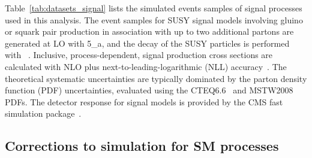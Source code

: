 Table~\ref{tab:datasets_signal} lists the simulated events samples of
signal processes used in this analysis. The event samples for SUSY
signal models involving gluino or squark pair production in
association with up to two additional partons are generated at LO with
{\MADGRAPH{}5\_a\MCATNLO}, and the decay of the SUSY particles is
performed with ~\cite{pythia}. Inclusive,
process-dependent, signal production cross sections are calculated
with NLO plus next-to-leading-logarithmic (NLL)
accuracy~\cite{Beenakker:1996ch, PhysRevLett.102.111802,
  PhysRevD.80.095004, 1126-6708-2009-12-041,
  doi:10.1142/S0217751X11053560, susynlo}. The theoretical systematic
uncertainties are typically dominated by the parton density function
(PDF) uncertainties, evaluated using the
CTEQ6.6~\cite{Nadolsky:2008zw} and MSTW2008~\cite{Martin:2009iq} PDFs.
The detector response for signal models is provided by the CMS fast
simulation package~\cite{fastsim}.

\begin{table}[hp!]
  \footnotesize 
  \label{tab:datasets_data}
\end{table}

\begin{table}[hp!]
  \centering
  \resizebox{!}{0.35\paperheight}{}
  \label{tab:datasets_bkg}
\end{table}

\begin{table}[hp!]
  \centering
  \resizebox{!}{0.35\paperheight}{}
  \label{tab:datasets_bkg2}
\end{table}

\begin{table}[h!]
  \centering
  \scriptsize
  
  \label{tab:datasets_signal}
\end{table}

\clearpage
\subsection{Corrections to simulation for SM processes}
\label{sec:sim-corrs}

